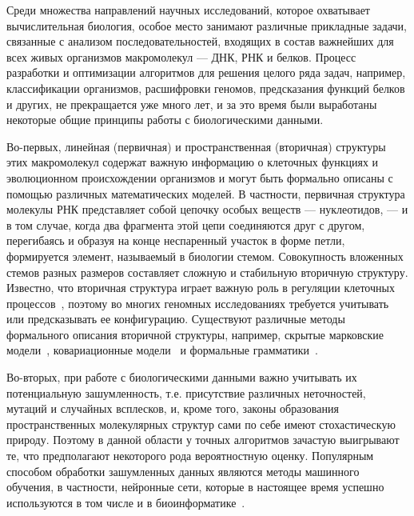 Среди множества направлений научных исследований, которое охватывает вычислительная биология, особое место занимают различные прикладные задачи, связанные с анализом последовательностей, входящих в состав важнейших для всех живых организмов макромолекул --- ДНК, РНК и белков. Процесс разработки и оптимизации алгоритмов для решения целого ряда задач, например, классификации организмов, расшифровки геномов, предсказания функций белков и других, не прекращается уже много лет, и за это время были выработаны некоторые общие принципы работы с биологическими данными.

Во-первых, линейная (первичная) и пространственная (вторичная) структуры этих макромолекул содержат важную информацию о клеточных функциях и эволюционном происхождении организмов и могут быть формально описаны с помощью различных математических моделей. В частности, первичная структура молекулы РНК представляет собой цепочку особых веществ --- нуклеотидов, --- и в том случае, когда два фрагмента этой цепи соединяются друг с другом, перегибаясь и образуя на конце неспаренный участок в форме петли, формируется элемент, называемый в биологии стемом. Совокупность вложенных стемов разных размеров составляет сложную и стабильную вторичную структуру. Известно, что вторичная структура играет важную роль в регуляции клеточных процессов~\cite{vandivier2016conservation}, поэтому во многих геномных исследованиях требуется учитывать или предсказывать ее конфигурацию. Существуют различные методы формального описания вторичной структуры, например, скрытые марковские модели~\cite{yoon2004hmm}, ковариационные модели~\cite{sippl1999biological} и формальные грамматики~\cite{dowell2004evaluation,knudsen1999rna,rivas2000language}.

Во-вторых, при работе с биологическими данными важно учитывать их потенциальную зашумленность, т.е. присутствие различных неточностей, мутаций и случайных всплесков, и, кроме того, законы образования пространственных молекулярных структур сами по себе имеют стохастическую природу. Поэтому в данной области у точных алгоритмов зачастую выигрывают те, что предполагают некоторого рода вероятностную оценку. Популярным способом обработки зашумленных данных являются методы машинного обучения, в частности, нейронные сети, которые в настоящее время успешно используются в том числе и в биоинформатике~\cite{higashi2009bacteria,sherman2017humidor}.

